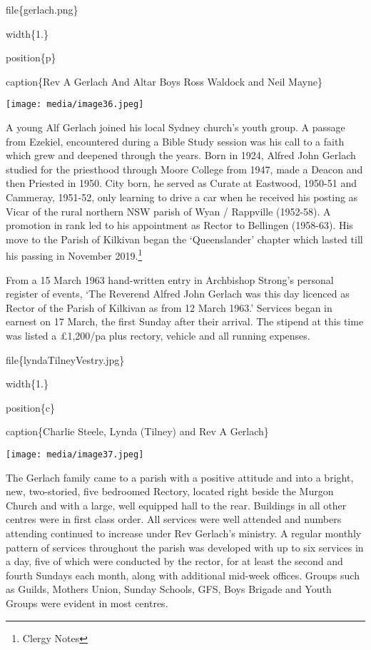 file\{gerlach.png\}

width\{1.\}

position\{p\}

caption\{Rev A Gerlach And Altar Boys Ross Waldock and Neil Mayne\}

\texttt{[image: media/image36.jpeg]}

A young Alf Gerlach joined his local Sydney church's youth group. A passage from Ezekiel, encountered during a Bible Study session was his call to a faith which grew and deepened through the years. Born in 1924, Alfred John Gerlach studied for the priesthood through Moore College from 1947, made a Deacon and then Priested in 1950. City born, he served as Curate at Eastwood, 1950-51 and Cammeray, 1951-52, only learning to drive a car when he received his posting as Vicar of the rural northern NSW parish of Wyan / Rappville (1952-58). A promotion in rank led to his appointment as Rector to Bellingen (1958-63). His move to the Parish of Kilkivan began the `Queenslander' chapter which lasted till his passing in November 2019.\footnote{Clergy Notes}

From a 15 March 1963 hand-written entry in Archbishop Strong's personal register of events, `The Reverend Alfred John Gerlach was this day licenced as Rector of the Parish of Kilkivan as from 12 March 1963.' Services began in earnest on 17 March, the first Sunday after their arrival. The stipend at this time was listed a £1,200/pa plus rectory, vehicle and all running expenses.

file\{lyndaTilneyVestry.jpg\}

width\{1.\}

position\{c\}

caption\{Charlie Steele, Lynda (Tilney) and Rev A Gerlach\}

\texttt{[image: media/image37.jpeg]}

The Gerlach family came to a parish with a positive attitude and into a bright, new, two-storied, five bedroomed Rectory, located right beside the Murgon Church and with a large, well equipped hall to the rear. Buildings in all other centres were in first class order. All services were well attended and numbers attending continued to increase under Rev Gerlach's ministry. A regular monthly pattern of services throughout the parish was developed with up to six services in a day, five of which were conducted by the rector, for at least the second and fourth Sundays each month, along with additional mid-week offices. Groups such as Guilds, Mothers Union, Sunday Schools, GFS, Boys Brigade and Youth Groups were evident in most centres.

